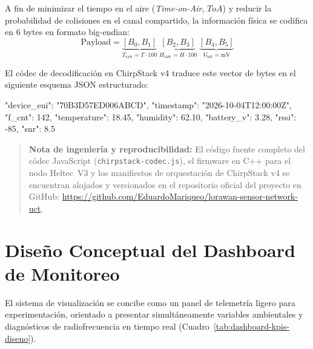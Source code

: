 \documentclass[12pt,oneside,openany,spanish,oldfontcommands]{memoir}
\begin{document}
A fin de minimizar el tiempo en el aire (\textit{Time-on-Air}, $ToA$) y reducir la probabilidad de
colisiones en el canal compartido, la información física se codifica en 6 bytes en formato
big-endian:
\begin{equation}
    \text{Payload} = \underbrace{[B_0, B_1]}_{T_{\text{raw}} = T \cdot 100} \; \underbrace{[B_2, B_3]}_{H_{\text{raw}} = H \cdot 100} \; \underbrace{[B_4, B_5]}_{V_{\text{bat}} = \text{mV}}
\end{equation}

El códec de decodificación en ChirpStack v4 traduce este vector de bytes en el siguiente esquema
JSON estructurado:
\begin{example}
{
  "device_eui": "70B3D57ED006ABCD",
  "timestamp": "2026-10-04T12:00:00Z",
  "f_cnt": 142,
  "temperature": 18.45,
  "humidity": 62.10,
  "battery_v": 3.28,
  "rssi": -85,
  "snr": 8.5
}
\end{example}

\begin{quote}
\small \textbf{Nota de ingeniería y reproducibilidad:} El código fuente completo del códec
JavaScript (\texttt{chirpstack-codec.js}), el firmware en C++ para el nodo Heltec~V3 y los
manifiestos de orquestación de ChirpStack v4 se encuentran alojados y versionados en el
repositorio oficial del proyecto en GitHub: \url{https://github.com/EduardoMariqueo/lorawan-sensor-network-uct}.
\end{quote}

\section{Diseño Conceptual del Dashboard de Monitoreo}\label{sec:diseno-dashboard}

El sistema de visualización se concibe como un panel de telemetría ligero para experimentación,
orientado a presentar simultáneamente variables ambientales y diagnósticos de radiofrecuencia en
tiempo real (Cuadro~\ref{tab:dashboard-kpis-diseno}).
\end{document}

